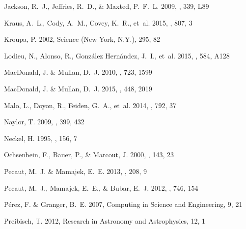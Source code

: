 \documentclass{aa}
\begin{document}
\begin{thebibliography}{71}
{Jackson}, R.~J., {Jeffries}, R.~D., \& {Maxted}, P.~F.~L. 2009, \mnras, 339,
  L89

{Kraus}, A.~L., {Cody}, A.~M., {Covey}, K.~R., {et~al.} 2015, \apj, 807, 3

Kroupa, P. 2002, Science (New York, N.Y.), 295, 82

{Lodieu}, N., {Alonso}, R., {Gonz{\'a}lez Hern{\'a}ndez}, J.~I., {et~al.} 2015,
  \aap, 584, A128

MacDonald, J. \& Mullan, D.~J. 2010, \apj, 723, 1599

{MacDonald}, J. \& {Mullan}, D.~J. 2015, \mnras, 448, 2019

{Malo}, L., {Doyon}, R., {Feiden}, G.~A., {et~al.} 2014, \apj, 792, 37

{Naylor}, T. 2009, \mnras, 399, 432

{Neckel}, H. 1995, \solphys, 156, 7

{Ochsenbein}, F., {Bauer}, P., \& {Marcout}, J. 2000, \aaps, 143, 23

{Pecaut}, M.~J. \& {Mamajek}, E.~E. 2013, \apjs, 208, 9

{Pecaut}, M.~J., {Mamajek}, E.~E., \& {Bubar}, E.~J. 2012, \apj, 746, 154

P\'erez, F. \& Granger, B.~E. 2007, Computing in Science and Engineering, 9, 21

{Preibisch}, T. 2012, Research in Astronomy and Astrophysics, 12, 1


\end{thebibliography}
\end{document}
